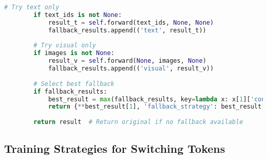 \begin{lstlisting}[language=Python, caption=Robust classification with modality switching]
        # Try text only
        if text_ids is not None:
            result_t = self.forward(text_ids, None, None)
            fallback_results.append(('text', result_t))
        
        # Try visual only
        if images is not None:
            result_v = self.forward(None, images, None)
            fallback_results.append(('visual', result_v))
        
        # Select best fallback
        if fallback_results:
            best_result = max(fallback_results, key=lambda x: x[1]['confidence'].item())
            return {**best_result[1], 'fallback_strategy': best_result[0]}
        
        return result  # Return original if no fallback available
\end{lstlisting}

\subsection{Training Strategies for Switching Tokens}

